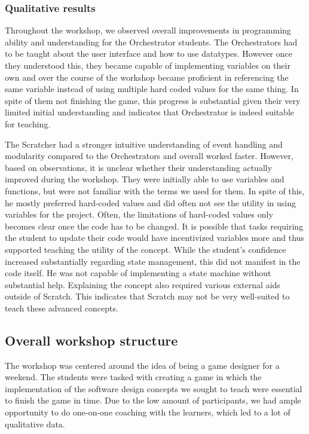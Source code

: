 \subsubsection{Qualitative results}
Throughout the workshop, we observed overall improvements in programming ability and understanding for the Orchestrator students.
The Orchestrators had to be taught about the user interface and how to use datatypes.
However once they understood this, they became capable of implementing variables on their own and over the course of the workshop became proficient in referencing the same variable instead of using multiple hard coded values for the same thing.
In spite of them not finishing the game, this progress is substantial given their very limited initial understanding and indicates that Orchestrator is indeed suitable for teaching.

The Scratcher had a stronger intuitive understanding of event handling and modularity compared to the Orchestrators and overall worked faster.
However, based on observations, it is unclear whether their understanding actually improved during the workshop.
They were initially able to use variables and functions, but were not familiar with the terms we used for them.
In spite of this, he mostly preferred hard-coded values and did often not see the utility in using variables for the project.
Often, the limitations of hard-coded values only becomes clear once the code has to be changed.
It is possible that tasks requiring the student to update their code would have incentivized variables more and thus supported teaching the utility of the concept.
While the student's confidence increased substantially regarding state management, this did not manifest in the code itself.
He was not capable of implementing a state machine without substantial help.
Explaining the concept also required various external aids outside of Scratch.
This indicates that Scratch may not be very well-suited to teach these advanced concepts.

\subsection{Overall workshop structure}
The workshop was centered around the idea of being a game designer for a weekend.
The students were tasked with creating a game in which the implementation of the software design concepts we sought to teach were essential to finish the game in time.
Due to the low amount of participants, we had ample opportunity to do one-on-one coaching with the learners, which led to a lot of qualitative data.

